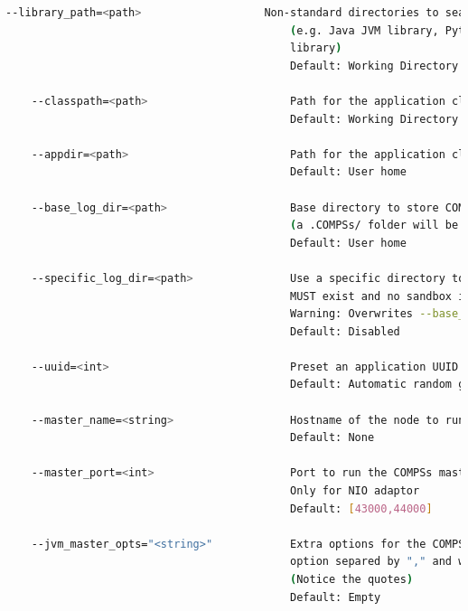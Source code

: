 \begin{lstlisting}[language=bash]
    --library_path=<path>                   Non-standard directories to search for libraries
                                            (e.g. Java JVM library, Python library, C binding
                                            library)
                                            Default: Working Directory
                                            
    --classpath=<path>                      Path for the application classes / modules
                                            Default: Working Directory
                                            
    --appdir=<path>                         Path for the application class folder.
                                            Default: User home
                                            
    --base_log_dir=<path>                   Base directory to store COMPSs log files 
                                            (a .COMPSs/ folder will be created inside this location)
                                            Default: User home
                                            
    --specific_log_dir=<path>               Use a specific directory to store COMPSs log files (the folder
                                            MUST exist and no sandbox is created)
                                            Warning: Overwrites --base_log_dir option
                                            Default: Disabled
                                            
    --uuid=<int>                            Preset an application UUID
                                            Default: Automatic random generation
                                            
    --master_name=<string>                  Hostname of the node to run the COMPSs master
                                            Default: None
                                            
    --master_port=<int>                     Port to run the COMPSs master communications.
                                            Only for NIO adaptor
                                            Default: [43000,44000]
                                            
    --jvm_master_opts="<string>"            Extra options for the COMPSs Master JVM. Each 
                                            option separed by "," and without blank spaces
                                            (Notice the quotes)
                                            Default: Empty
                                            

\end{lstlisting}
